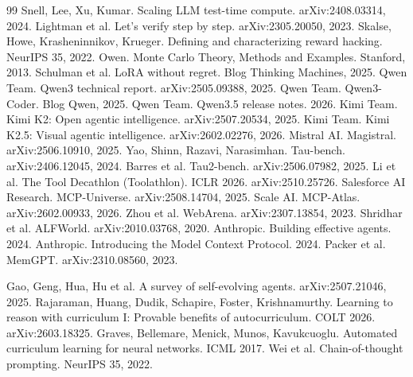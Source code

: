 \documentclass[11pt,a4paper]{article}
\begin{document}
\begin{thebibliography}{99}
 Snell, Lee, Xu, Kumar. Scaling LLM test-time compute. arXiv:2408.03314, 2024.
 Lightman et al. Let's verify step by step. arXiv:2305.20050, 2023.
 Skalse, Howe, Krasheninnikov, Krueger. Defining and characterizing reward hacking. NeurIPS 35, 2022.
 Owen. Monte Carlo Theory, Methods and Examples. Stanford, 2013.
 Schulman et al. LoRA without regret. Blog Thinking Machines, 2025.
 Qwen Team. Qwen3 technical report. arXiv:2505.09388, 2025.
 Qwen Team. Qwen3-Coder. Blog Qwen, 2025.
 Qwen Team. Qwen3.5 release notes. 2026. %
 Kimi Team. Kimi K2: Open agentic intelligence. arXiv:2507.20534, 2025.
 Kimi Team. Kimi K2.5: Visual agentic intelligence. arXiv:2602.02276, 2026.
 Mistral AI. Magistral. arXiv:2506.10910, 2025.
 Yao, Shinn, Razavi, Narasimhan. Tau-bench. arXiv:2406.12045, 2024.
 Barres et al. Tau2-bench. arXiv:2506.07982, 2025.
 Li et al. The Tool Decathlon (Toolathlon). ICLR 2026. arXiv:2510.25726.
 Salesforce AI Research. MCP-Universe. arXiv:2508.14704, 2025.
 Scale AI. MCP-Atlas. arXiv:2602.00933, 2026.
 Zhou et al. WebArena. arXiv:2307.13854, 2023.
 Shridhar et al. ALFWorld. arXiv:2010.03768, 2020.
 Anthropic. Building effective agents. 2024.
 Anthropic. Introducing the Model Context Protocol. 2024.
 Packer et al. MemGPT. arXiv:2310.08560, 2023.

 Gao, Geng, Hua, Hu et al. A survey of self-evolving agents. arXiv:2507.21046, 2025.
 Rajaraman, Huang, Dudik, Schapire, Foster, Krishnamurthy. Learning to reason with curriculum I: Provable benefits of autocurriculum. COLT 2026. arXiv:2603.18325.
 Graves, Bellemare, Menick, Munos, Kavukcuoglu. Automated curriculum learning for neural networks. ICML 2017.
 Wei et al. Chain-of-thought prompting. NeurIPS 35, 2022.


\end{thebibliography}
\end{document}
